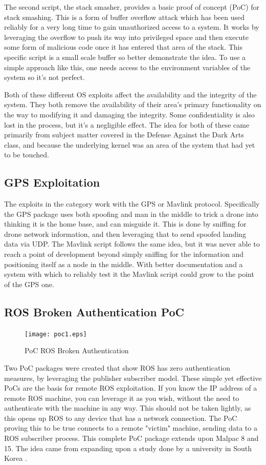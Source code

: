\documentclass[IEEEtran,letterpaper,10pt,notitlepage,draftclsnofoot]{article}
\begin{document}
The second script, the stack smasher, provides a basic proof of concept (PoC) for stack smashing. \cite{SS}
This is a form of buffer overflow attack which has been used reliably for a very long time to gain unauthorized access to a system.
It works by leveraging the overflow to push its way into privileged space and then execute some form of malicious code once it has entered that area of the stack. \cite{SS2}
This specific script is a small scale buffer so better demonstrate the idea.
To use a simple approach like this, one needs access to the environment variables of the system so it's not perfect.

Both of these different OS exploits affect the availability and the integrity of the system.
They both remove the availability of their area's primary functionality on the way to modifying it and damaging the integrity.
Some confidentiality is also lost in the process, but it's a negligible effect.
The idea for both of these came primarily from subject matter covered in the Defense Against the Dark Arts class, and because the underlying kernel was an area of the system that had yet to be touched.

\subsection{GPS Exploitation}
The exploits in the category work with the GPS or Mavlink protocol.
Specifically the GPS package uses both spoofing and man in the middle to trick a drone into thinking it is the home base, and can misguide it.
This is done by sniffing for drone network information, and then leveraging that to send spoofed landing data via UDP.
The Mavlink script follows the same idea, but it was never able to reach a point of development beyond simply sniffing for the information and positioning itself as a node in the middle.
With better documentation and a system with which to reliably test it the Mavlink script could grow to the point of the GPS one.

\subsection{ROS Broken Authentication PoC}
\begin{figure}[H]
  \centering
    \texttt{[image: poc1.eps]}
    \caption{PoC ROS Broken Authentication}
\end{figure}

Two PoC packages were created that show ROS has zero authentication measures, by leveraging the publisher subscriber model.
These simple yet effective PoCs are the basis for remote ROS exploitation. If you know the IP address of a remote ROS machine, you can leverage it as you wish, without the need
to authenticate with the machine in any way. This should not be taken lightly, as this opens up ROS to any device that has a network connection. The PoC proving this to be true
connects to a remote "victim" machine, sending data to a ROS subscriber process. This complete PoC package extends upon Malpac 8 and 15. The idea came from expanding upon a study done by a university in South Korea \cite{ROSVulnCounter}.
\end{document}
